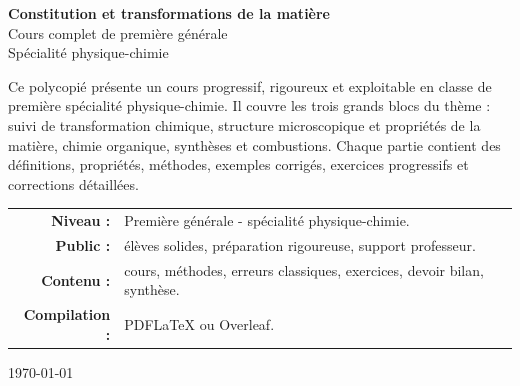 \documentclass[11pt,a4paper]{article}
\begin{document}
\begin{titlepage}
\begin{center}
\vspace*{0.8cm}
{\Huge\bfseries Constitution et transformations de la matière}\\[0.25cm]
{\LARGE Cours complet de première générale}\\[0.25cm]
{\Large Spécialité physique-chimie}\\[0.8cm]


\vfill

\begin{tcolorbox}[colframe=bleuprepa,colback=bleuclair,width=0.92\textwidth,title=Objectif du document]
Ce polycopié présente un cours progressif, rigoureux et exploitable en classe de première spécialité physique-chimie. Il couvre les trois grands blocs du thème : suivi de transformation chimique, structure microscopique et propriétés de la matière, chimie organique, synthèses et combustions. Chaque partie contient des définitions, propriétés, méthodes, exemples corrigés, exercices progressifs et corrections détaillées.
\end{tcolorbox}

\vfill

\begin{tabular}{rl}
\textbf{Niveau :} & Première générale - spécialité physique-chimie.\\
\textbf{Public :} & élèves solides, préparation rigoureuse, support professeur.\\
\textbf{Contenu :} & cours, méthodes, erreurs classiques, exercices, devoir bilan, synthèse.\\
\textbf{Compilation :} & PDFLaTeX ou Overleaf.\\
\end{tabular}

\vfill
{\large \today}
\end{center}
\end{titlepage}
\end{document}
